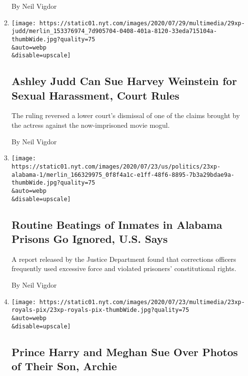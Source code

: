 \begin{enumerate}
  By Neil Vigdor
\item
  \href{/2020/07/29/business/media/judd-weinstein-lawsuit-appeal.html}{}

  \texttt{[image: https://static01.nyt.com/images/2020/07/29/multimedia/29xp-judd/merlin\_153376974\_7d905704-0408-401a-8120-33eda715104a-thumbWide.jpg?quality=75\\\&auto=webp\\\&disable=upscale]}

  \hypertarget{ashley-judd-can-sue-harvey-weinstein-for-sexual-harassment-court-rules}{%
  \subsection{Ashley Judd Can Sue Harvey Weinstein for Sexual
  Harassment, Court
  Rules}\label{ashley-judd-can-sue-harvey-weinstein-for-sexual-harassment-court-rules}}

  The ruling reversed a lower court's dismissal of one of the claims
  brought by the actress against the now-imprisoned movie mogul.

  By Neil Vigdor
\item
  \href{/2020/07/24/us/alabama-prisons-excessive-force.html}{}

  \texttt{[image: https://static01.nyt.com/images/2020/07/23/us/politics/23xp-alabama-1/merlin\_166329975\_0f8f4a1c-e1ff-48f6-8895-7b3a29bdae9a-thumbWide.jpg?quality=75\\\&auto=webp\\\&disable=upscale]}

  \hypertarget{routine-beatings-of-inmates-in-alabama-prisons-go-ignored-us-says}{%
  \subsection{Routine Beatings of Inmates in Alabama Prisons Go Ignored,
  U.S.
  Says}\label{routine-beatings-of-inmates-in-alabama-prisons-go-ignored-us-says}}

  A report released by the Justice Department found that corrections
  officers frequently used excessive force and violated prisoners'
  constitutional rights.

  By Neil Vigdor
\item
  \href{/2020/07/23/us/meghan-harry-paparazzi.html}{}

  \texttt{[image: https://static01.nyt.com/images/2020/07/23/multimedia/23xp-royals-pix/23xp-royals-pix-thumbWide.jpg?quality=75\\\&auto=webp\\\&disable=upscale]}

  \hypertarget{prince-harry-and-meghan-sue-over-photos-of-their-son-archie}{%
  \subsection{Prince Harry and Meghan Sue Over Photos of Their Son,
  Archie}\label{prince-harry-and-meghan-sue-over-photos-of-their-son-archie}}


\end{enumerate}
